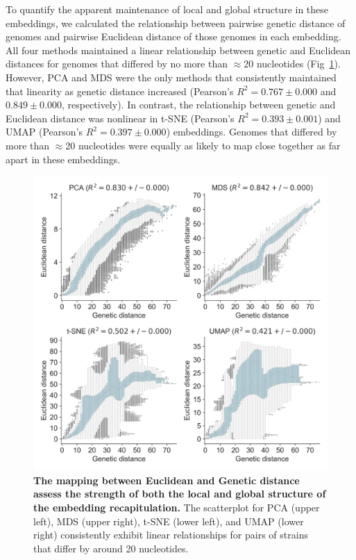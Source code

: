 \documentclass[10pt,letterpaper]{article}
\begin{document}
To quantify the apparent maintenance of local and global structure in these embeddings, we calculated the relationship between pairwise genetic distance of genomes and pairwise Euclidean distance of those genomes in each embedding.
All four methods maintained a linear relationship between genetic and Euclidean distances for genomes that differed by no more than $\approx$20 nucleotides (Fig~\ref{fig:seasonal-influenza-h3n2-ha-pairwise-distances}).
However, PCA and MDS were the only methods that consistently maintained that linearity as genetic distance increased (Pearson's $R^{2} = 0.767 \pm 0.000$  and $0.849 \pm 0.000$, respectively).
In contrast, the relationship between genetic and Euclidean distance was nonlinear in t-SNE (Pearson's $R^{2} = 0.393 \pm 0.001$) and UMAP (Pearson's $R^{2} = 0.397 \pm 0.000$) embeddings.
Genomes that differed by more than $\approx$20 nucleotides were equally as likely to map close together as far apart in these embeddings.

\begin{figure}[!h]
\includegraphics[width=\columnwidth]{figures/flu-2016-2018-ha-euclidean-distance-by-genetic-distance.png}
\caption{{\bf The mapping between Euclidean and Genetic distance assess the strength of both the local and global structure of the embedding recapitulation.}
The scatterplot for PCA (upper left), MDS (upper right), t-SNE (lower left), and UMAP (lower right) consistently exhibit linear relationships for pairs of strains that differ by around 20 nucleotides.}
\label{fig:seasonal-influenza-h3n2-ha-pairwise-distances}
\end{figure}
\end{document}
